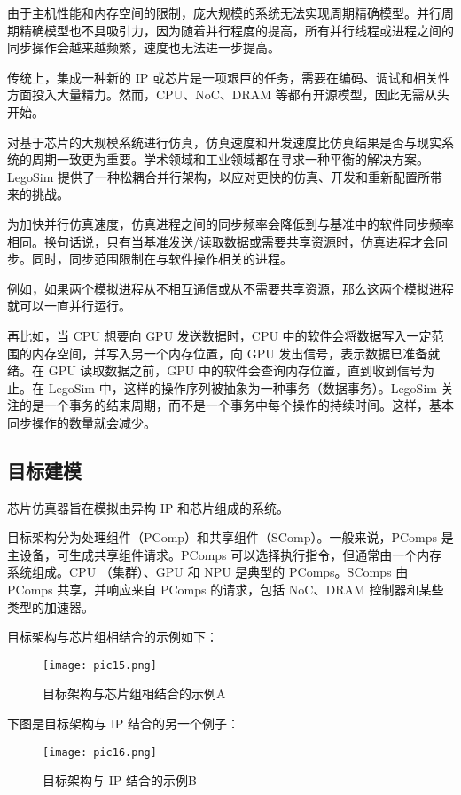 \documentclass[bachelor]{thesis-uestc}
\begin{document}
由于主机性能和内存空间的限制，庞大规模的系统无法实现周期精确模型。并行周期精确模型也不具吸引力，因为随着并行程度的提高，所有并行线程或进程之间的同步操作会越来越频繁，速度也无法进一步提高。

传统上，集成一种新的 IP 或芯片是一项艰巨的任务，需要在编码、调试和相关性方面投入大量精力。然而，CPU、NoC、DRAM 等都有开源模型，因此无需从头开始。

对基于芯片的大规模系统进行仿真，仿真速度和开发速度比仿真结果是否与现实系统的周期一致更为重要。学术领域和工业领域都在寻求一种平衡的解决方案。LegoSim 提供了一种松耦合并行架构，以应对更快的仿真、开发和重新配置所带来的挑战。

为加快并行仿真速度，仿真进程之间的同步频率会降低到与基准中的软件同步频率相同。换句话说，只有当基准发送/读取数据或需要共享资源时，仿真进程才会同步。同时，同步范围限制在与软件操作相关的进程。

例如，如果两个模拟进程从不相互通信或从不需要共享资源，那么这两个模拟进程就可以一直并行运行。

再比如，当 CPU 想要向 GPU 发送数据时，CPU 中的软件会将数据写入一定范围的内存空间，并写入另一个内存位置，向 GPU 发出信号，表示数据已准备就绪。在 GPU 读取数据之前，GPU 中的软件会查询内存位置，直到收到信号为止。在 LegoSim 中，这样的操作序列被抽象为一种事务（数据事务）。LegoSim 关注的是一个事务的结束周期，而不是一个事务中每个操作的持续时间。这样，基本同步操作的数量就会减少。


\subsection{目标建模}
芯片仿真器旨在模拟由异构 IP 和芯片组成的系统。

目标架构分为处理组件（PComp）和共享组件（SComp）。一般来说，PComps 是主设备，可生成共享组件请求。PComps 可以选择执行指令，但通常由一个内存系统组成。CPU （集群）、GPU 和 NPU 是典型的 PComps。SComps 由 PComps 共享，并响应来自 PComps 的请求，包括 NoC、DRAM 控制器和某些类型的加速器。

目标架构与芯片组相结合的示例如下：
\begin{figure}[h]
    \texttt{[image: pic15.png]}
    \caption{目标架构与芯片组相结合的示例A}
    \label{pic15}
\end{figure}

下图是目标架构与 IP 结合的另一个例子：
\begin{figure}[h]
    \texttt{[image: pic16.png]}
    \caption{目标架构与 IP 结合的示例B}
    \label{pic16}
\end{figure}
\end{document}
